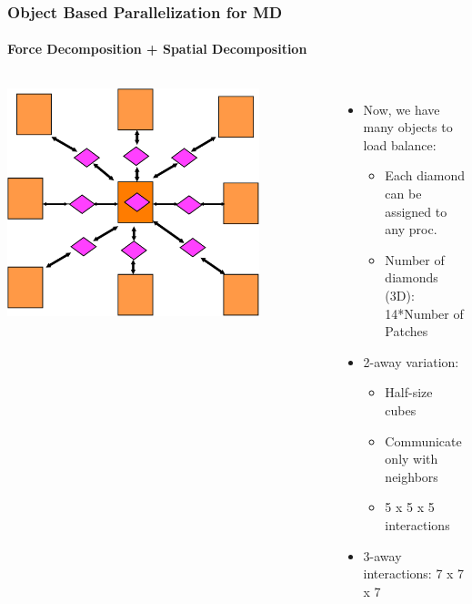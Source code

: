 \begin{frame}[t]
\frametitle{Object Based Parallelization for MD}
\framesubtitle{Force Decomposition + Spatial Decomposition}
  \begin{columns}
  \begin{center} \includegraphics[width=0.8\textwidth]{figures/namd_decomp2.pdf} \end{center}
  \begin{itemize}
    \item Now, we have many objects to load balance:
    \begin{itemize}
      \item Each diamond can be  assigned to any proc.
      \item Number of diamonds (3D): 14*Number of Patches
    \end{itemize}
    \pause
    \item 2-away variation:
    \begin{itemize}
      \item Half-size cubes
      \item Communicate only with neighbors
      \item 5 x 5 x 5 interactions
    \end{itemize}
    \pause
    \item 3-away interactions: 7 x 7 x 7
  \end{itemize}
  \end{columns}
\end{frame}

